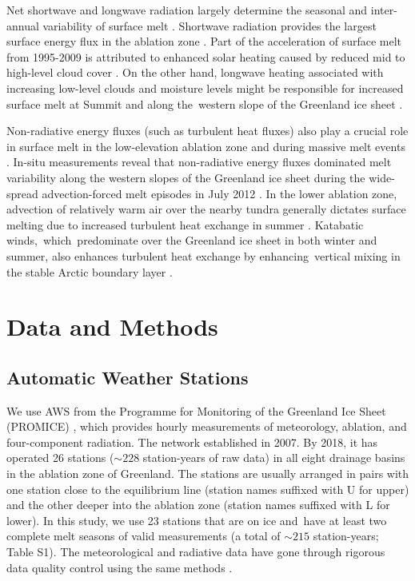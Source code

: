 \documentclass[draft]{agujournal2019}
\begin{document}
Net shortwave and longwave radiation largely 
determine the seasonal and inter-annual variability 
of surface melt 
\cite{VandeWal2005, VandenBroeke2008a, KuipersMunneke2018}.
Shortwave radiation provides the largest surface energy flux 
in the ablation zone \cite{VandenBroeke2008a}. 
Part of the acceleration of surface melt from 1995-2009 
is attributed to enhanced solar heating caused 
by reduced mid to high-level cloud cover 
\cite{Hofer2017, Ding2017}. 
On the other hand, longwave heating associated with 
increasing low-level clouds and moisture levels 
might be responsible for increased surface melt 
at Summit and along the western slope of 
the Greenland ice sheet 
\cite{Bennartz2013, Miller2015, VanTricht2016, Mattingly2018}. 

Non-radiative energy fluxes (such as turbulent heat fluxes) 
also play a crucial role in surface melt 
in the low-elevation ablation zone \cite{VandenBroeke2011, KuipersMunneke2018a} 
and during massive melt events \cite{Fausto2016a}. 
In-situ measurements reveal that 
non-radiative energy fluxes dominated melt variability 
along the western slopes of the Greenland ice sheet 
during the wide-spread advection-forced melt episodes 
in July 2012 \cite{Fausto2016a}. 
In the lower ablation zone, 
advection of relatively warm air over the nearby tundra 
generally dictates surface melting 
due to increased turbulent heat exchange 
in summer \cite{VandenBroeke2011, KuipersMunneke2018a}. 
Katabatic winds, which predominate over the Greenland ice sheet 
in both winter and summer, 
also enhances turbulent heat exchange 
by enhancing vertical mixing 
in the stable Arctic boundary layer \cite{VandenBroeke2009a}. 

\section{Data and Methods}
\subsection{Automatic Weather Stations}
We use AWS from 
the Programme for Monitoring of the Greenland Ice Sheet (PROMICE) \cite{Fausto2019}, 
which provides hourly measurements of meteorology, ablation, 
and four-component radiation. 
The network established in 2007. 
By 2018, it has operated 26 stations ($\sim 228$ station-years of raw data) 
in all eight drainage basins in the ablation zone of Greenland. 
The stations are usually arranged in pairs with 
one station close to the equilibrium line 
(station names suffixed with U for upper) 
and the other deeper into the ablation zone 
(station names suffixed with L for lower). 
In this study, we use 23 stations 
that are on ice and have at least two complete melt seasons of 
valid measurements (a total of $\sim 215$ station-years; Table S1). 
The meteorological and radiative data have gone through 
rigorous data quality control using the same methods \cite{Wang2016, Wang2018, Wang2018a}. 
\end{document}
